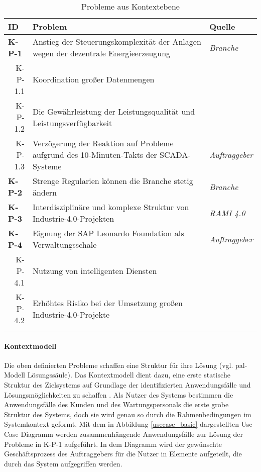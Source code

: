 \begin{table}[H]
  \begin{tabularx}{\textwidth}{@{}lXp{2cm}@{}}
      \toprule
      ID                & Problem & Quelle \\
      \midrule
      \textbf{K-P-1}              &       Anstieg der Steuerungskomplexität der Anlagen wegen der dezentrale Energieerzeugung               & \textit{Branche}                \\
      \multicolumn{1}{r}{K-P-1.1} &  Koordination großer Datenmengen     \\
      \multicolumn{1}{r}{K-P-1.2} &  Die Gewährleistung der Leistungsqualität und Leistungsverfügbarkeit \\
      \multicolumn{1}{r}{K-P-1.3} &  Verzögerung der Reaktion auf Probleme aufgrund des 10-Minuten-Takts der SCADA-Systeme & \textit{Auftraggeber} \\\addlinespace
      \textbf{K-P-2}              & Strenge Regularien können die Branche stetig ändern                     & \textit{Branche}                \\ \addlinespace
      \textbf{K-P-3}              & Interdisziplinäre und komplexe Struktur von Industrie-4.0-Projekten                      & \textit{RAMI 4.0}                \\
      \textbf{K-P-4}              &  Eignung der SAP Leonardo Foundation als Verwaltungsschale  & \textit{Auftraggeber} \\
      \multicolumn{1}{r}{K-P-4.1} &  Nutzung von intelligenten Diensten\\
      \multicolumn{1}{r}{K-P-4.2} &  Erhöhtes Risiko bei der Umsetzung großen Industrie-4.0-Projekte\\
      \addlinespace
      \bottomrule
  \end{tabularx}
  \label{kontext_probleme}
  \caption{Probleme aus Kontextebene}
\end{table}

\paragraph{Kontextmodell}

Die oben definierten Probleme schaffen eine Struktur für ihre Lösung (vgl. \ac{pal}-Modell Lösungssäule). Das Kontextmodell dient dazu, eine erste statische Struktur des Zielsystems auf Grundlage der identifizierten Anwendungsfälle und Lösungsmöglichkeiten zu schaffen \citep{Lauenroth2016}. Als Nutzer des Systems bestimmen die Anwendungsfälle des Kunden und des Wartungspersonals die erste grobe Struktur des Systems, doch sie wird genau so durch die Rahmenbedingungen im Systemkontext geformt.
Mit dem in Abbildung \ref{usecase_basic} dargestellten Use Case Diagramm werden zusammenhängende Anwendungsfälle zur Lösung der Probleme in K-P-1 aufgeführt. In dem Diagramm wird der gewünschte Geschäftsprozess des Auftraggebers für die Nutzer in Elemente aufgeteilt, die durch das System aufgegriffen werden.

